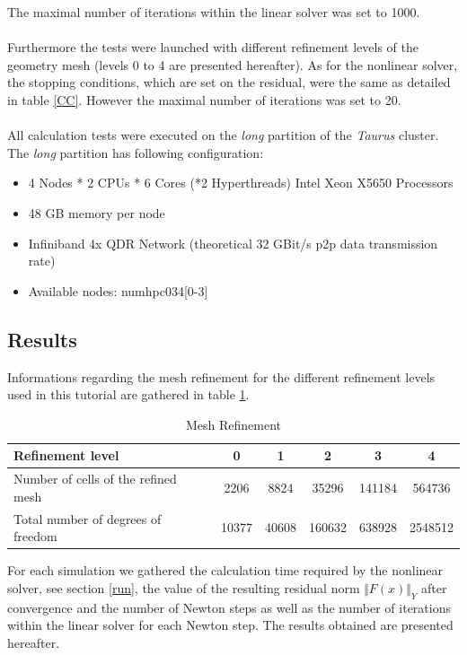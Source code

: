 \documentclass[a4paper, 11pt, twoside]{article}
\begin{document}
The maximal number of iterations within the linear solver was set to 1000. \\ \\
Furthermore the tests were launched with different refinement levels of the geometry mesh (levels 0 to 4 are presented hereafter). As for the nonlinear solver, the stopping conditions, which are set on the residual, were the same as detailed in table \ref{CC}. However the maximal number of iterations was set to 20. \\ \\ 
All calculation tests were executed on the \emph{long} partition of the \emph{Taurus} cluster. The \emph{long} partition has following configuration:

\begin{itemize}
\item 4 Nodes * 2 CPUs * 6 Cores (*2 Hyperthreads) Intel Xeon X5650 Processors
\item 48 GB memory per node
\item Infiniband 4x QDR Network (theoretical 32 GBit/s p2p data transmission rate)
\item Available nodes: numhpc034[0-3]
\end{itemize}


\subsection{Results}
Informations regarding the mesh refinement for the different refinement levels used in this tutorial are gathered in table \ref{MR}.
\begin{table}[t] 

\centering
\begin{tabular}{l|ccccc}
Refinement level & 0 & 1 & 2 & 3 & 4 \\
\hline \hline
Number of cells of the refined mesh & 2206 & 8824 & 35296 & 141184 & 564736 \\
Total number of degrees of freedom & 10377 & 40608 & 160632 & 638928 & 2548512 \\
\end{tabular}

\caption{Mesh Refinement} \label{MR}

\end{table}

For each simulation we gathered the calculation time required by the nonlinear solver, see section \ref{run}, the value of the resulting residual norm $\Vert F(x)\Vert_Y$ after convergence and the number of Newton steps as well as the number of iterations within the linear solver for each Newton step. The results obtained are presented hereafter.
\end{document}

